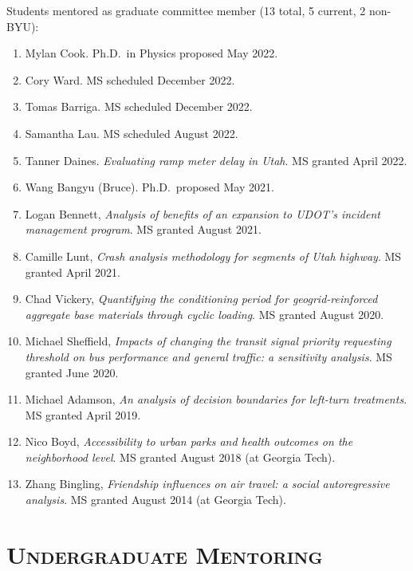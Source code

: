 \documentclass[margin,line]{res}
\newcounter{enuminitialize}
\newenvironment{myenum}[1][]
{%
 \setcounter{enuminitialize}{#1}
 \addtocounter{enuminitialize}{2}
 \begin{enumerate}[left= 4pt, itemsep=12pt, start=\value{enuminitialize}, label=\arabic*\addtocounter{enumi}{-2}]
}
{%
 \end{enumerate}
}
\newcommand{\secfont}{\scshape }
\begin{document}
\begin{resume}
Students mentored as graduate committee member (13 total, 5 current, 2 non-BYU):
\vspace{0.3cm}
\begin{myenum}[13]
  \item Mylan Cook. Ph.D.\ in Physics proposed May 2022.
  \item Cory Ward. MS scheduled December 2022.
  \item Tomas Barriga. MS scheduled December 2022.
  \item Samantha Lau. MS scheduled August 2022.
  \item Tanner Daines. \textit{Evaluating ramp meter delay in Utah}. MS granted April 2022.
  \item Wang Bangyu (Bruce). Ph.D.\ proposed May 2021.
  \item Logan Bennett, \textit{Analysis of benefits of an expansion to UDOT’s incident management program}. MS granted August 2021.
  \item Camille Lunt, \textit{Crash analysis methodology for segments of Utah highway}. MS granted April 2021.
  \item Chad Vickery, \textit{Quantifying the conditioning period for geogrid-reinforced aggregate base materials through cyclic loading}. MS granted August 2020.
  \item Michael Sheffield, \textit{Impacts of changing the transit signal priority requesting threshold on bus performance and general traffic: a sensitivity analysis}. MS granted June 2020.
  \item Michael Adamson, \textit{An analysis of decision boundaries for left-turn treatments}. MS granted April 2019.
  \item Nico Boyd, \textit{Accessibility to urban parks and health outcomes on the neighborhood level}. MS granted August 2018 (at Georgia Tech).
  \item Zhang Bingling, \textit{Friendship influences on air travel: a social autoregressive analysis}. MS granted August 2014 (at Georgia Tech).
\end{myenum}


\noindent\makebox[\linewidth]{\rule{\linewidth}{0.4pt}}
\section{\secfont Undergraduate Mentoring}


\end{resume}
\end{document}
